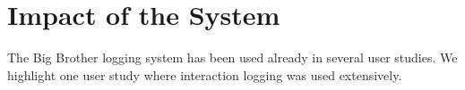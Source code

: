 \section{Impact of the System}

The Big Brother logging system has been used already in several user studies. We highlight one user study where interaction logging was used extensively.